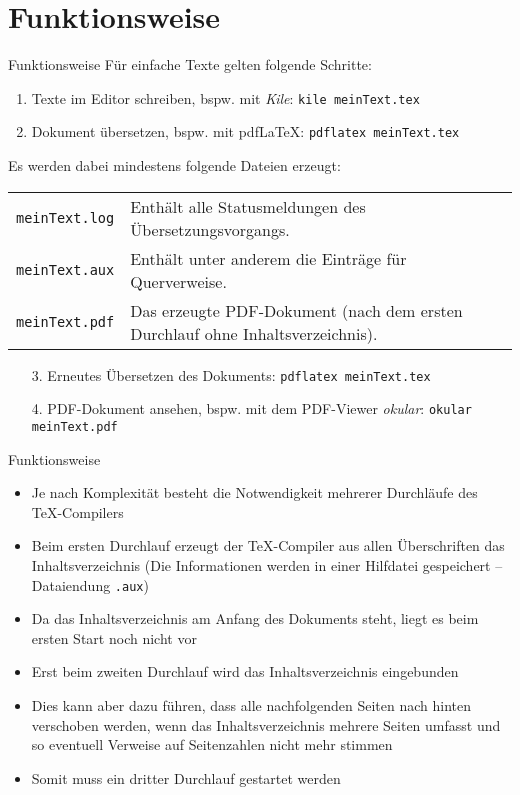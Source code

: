 \section{Funktionsweise}

\begin{frame}{Funktionsweise}
Für einfache Texte gelten folgende Schritte:
\begin{enumerate}
	\item Texte im Editor schreiben, bspw. mit \textit{Kile}: \texttt{kile meinText.tex}
	\item Dokument übersetzen, bspw. mit pdf\LaTeX{}: \texttt{pdflatex meinText.tex}
	\newline
\end{enumerate}
Es werden dabei mindestens folgende Dateien erzeugt:
\begin{tabular}[pos]{lp{8.5cm}}
	\texttt{meinText.log} & Enthält alle Statusmeldungen des Übersetzungsvorgangs. \\
	\texttt{meinText.aux} & Enthält unter anderem die Einträge für Querverweise. \\
	\texttt{meinText.pdf} & Das erzeugte PDF-Dokument (nach dem ersten Durchlauf ohne Inhaltsverzeichnis).
\end{tabular}
\begin{enumerate}
	\item[3.] Erneutes Übersetzen des Dokuments: \texttt{pdflatex meinText.tex}
	\item[4.] PDF-Dokument ansehen, bspw. mit dem PDF-Viewer \textit{okular}: \texttt{okular meinText.pdf}
\end{enumerate}
\end{frame}

\begin{frame}{Funktionsweise}
\begin{itemize}
	\item Je nach Komplexität besteht die Notwendigkeit mehrerer Durchläufe des \TeX{}-Compilers
	\newline
	\item Beim ersten Durchlauf erzeugt der \TeX{}-Compiler aus allen Überschriften das Inhaltsverzeichnis (Die Informationen werden in einer Hilfdatei gespeichert -- Dataiendung \texttt{.aux})
	\newline
	\item Da das Inhaltsverzeichnis am Anfang des Dokuments steht, liegt es beim ersten Start noch nicht vor
	\newline
	\item Erst beim zweiten Durchlauf wird das Inhaltsverzeichnis eingebunden
	\newline
	\item Dies kann aber dazu führen, dass alle nachfolgenden Seiten nach hinten verschoben werden, wenn das Inhaltsverzeichnis mehrere Seiten umfasst und so eventuell Verweise auf Seitenzahlen nicht mehr stimmen
	\newline
	\item Somit muss ein dritter Durchlauf gestartet werden
\end{itemize}
\end{frame}
